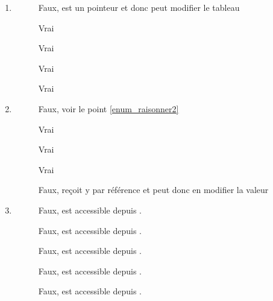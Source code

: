 \begin{Answer}[ref={ex:fonction_raisonner2}]
  \begin{enumerate}
  \item \label{enum_raisonner2}
\begin{description}
\item[]Faux,  est un pointeur et donc  peut modifier le tableau
\item[] Vrai
\item[] Vrai
\item[] Vrai
\item[] Vrai
\end{description}

     \item
\begin{description}
\item[] Faux, voir le point \ref{enum_raisonner2}
\item[] Vrai
\item[] Vrai
\item[] Vrai
\item[] Faux,  reçoit y par référence et peut donc en modifier la valeur
\end{description}

     \item
\begin{description}
\item[] Faux,  est accessible depuis .
\item[] Faux,  est accessible depuis .
\item[] Faux,  est accessible depuis .
\item[] Faux,  est accessible depuis .
\item[] Faux,  est accessible depuis .
\end{description}
\end{enumerate}

\end{Answer}